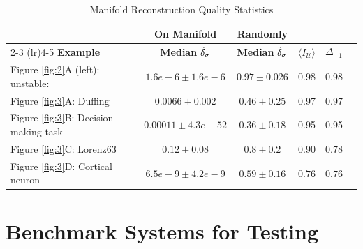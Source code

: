 \documentclass{article}
\theoremstyle{example}
\theoremstyle{plain}
\theoremstyle{definition}
\theoremstyle{remark}
\begin{document}
\label{app:manifoldquality}
\begin{table}[h!]
\centering
\caption{Manifold Reconstruction Quality Statistics}
\label{tab:mean_median_comparison}
\begin{tabular}{lccccc}
\toprule
& \multicolumn{1}{c}{\textbf{On Manifold}} & \multicolumn{1}{c}{\textbf{Randomly}} \\
\cmidrule(lr){2-3} \cmidrule(lr){4-5}
\textbf{Example} &  \textbf{Median} $\Tilde{\delta}_{\sigma}$ & \textbf{Median} $\Tilde{\delta}_{\sigma}$ & $\langle I_\mathcal{U} \rangle$ & $\Delta_{+1}$ \\
\midrule
 Figure \ref{fig:2}A (left): unstable: & $1.6e-6 \pm 1.6e-6$ &   $0.97 \pm 0.026$ & 0.98 & 0.98\\
Figure \ref{fig:3}A: Duffing & $0.0066 \pm 0.002$ &  $0.46 \pm 0.25$ & 0.97 & 0.97 \\
Figure \ref{fig:3}B: Decision making task &  $0.00011 \pm 4.3e-52$  & $0.36 \pm 0.18$ & 0.95 & 0.95 \\
Figure \ref{fig:3}C: Lorenz63 & $0.12 \pm 0.08$   & $0.8 \pm 0.2$ & 0.90 & 0.78 \\
Figure \ref{fig:3}D: Cortical neuron & $6.5e-9\pm 4.2e-9$ &  $0.59 \pm 0.16$  & $0.76$ & $0.76$  \\
\bottomrule
\end{tabular}%
\end{table}


\newpage
\color{black}
\section{Benchmark Systems for Testing}
\end{document}
